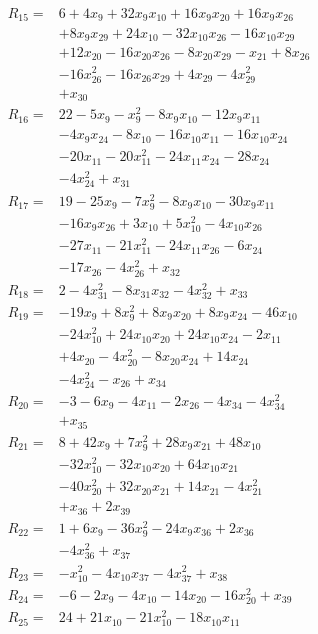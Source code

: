 \begin{align*}
R_{15}={}&6 +4x_{9} +32x_{9}x_{10} +16x_{9}x_{20} +16x_{9}x_{26}\\
&+8x_{9}x_{29} +24x_{10} -32x_{10}x_{26} -16x_{10}x_{29}\\
&+12x_{20} -16x_{20}x_{26} -8x_{20}x_{29} -x_{21} +8x_{26}\\
&-16x_{26}^{2} -16x_{26}x_{29} +4x_{29} -4x_{29}^{2}\\
&+x_{30}\\[3pt]
R_{16}={}&22 -5x_{9} -x_{9}^{2} -8x_{9}x_{10} -12x_{9}x_{11}\\
&-4x_{9}x_{24} -8x_{10} -16x_{10}x_{11} -16x_{10}x_{24}\\
&-20x_{11} -20x_{11}^{2} -24x_{11}x_{24} -28x_{24}\\
&-4x_{24}^{2} +x_{31}\\[3pt]
R_{17}={}&19 -25x_{9} -7x_{9}^{2} -8x_{9}x_{10} -30x_{9}x_{11}\\
&-16x_{9}x_{26} +3x_{10} +5x_{10}^{2} -4x_{10}x_{26}\\
&-27x_{11} -21x_{11}^{2} -24x_{11}x_{26} -6x_{24}\\
&-17x_{26} -4x_{26}^{2} +x_{32}\\[3pt]
R_{18}={}&2 -4x_{31}^{2} -8x_{31}x_{32} -4x_{32}^{2} +x_{33}\\[3pt]
R_{19}={}&-19x_{9} +8x_{9}^{2} +8x_{9}x_{20} +8x_{9}x_{24} -46x_{10}\\
&-24x_{10}^{2} +24x_{10}x_{20} +24x_{10}x_{24} -2x_{11}\\
&+4x_{20} -4x_{20}^{2} -8x_{20}x_{24} +14x_{24}\\
&-4x_{24}^{2} -x_{26} +x_{34}\\[3pt]
R_{20}={}&-3 -6x_{9} -4x_{11} -2x_{26} -4x_{34} -4x_{34}^{2}\\
&+x_{35}\\[3pt]
R_{21}={}&8 +42x_{9} +7x_{9}^{2} +28x_{9}x_{21} +48x_{10}\\
&-32x_{10}^{2} -32x_{10}x_{20} +64x_{10}x_{21}\\
&-40x_{20}^{2} +32x_{20}x_{21} +14x_{21} -4x_{21}^{2}\\
&+x_{36} +2x_{39}\\[3pt]
R_{22}={}&1 +6x_{9} -36x_{9}^{2} -24x_{9}x_{36} +2x_{36}\\
&-4x_{36}^{2} +x_{37}\\[3pt]
R_{23}={}&-x_{10}^{2} -4x_{10}x_{37} -4x_{37}^{2} +x_{38}\\[3pt]
R_{24}={}&-6 -2x_{9} -4x_{10} -14x_{20} -16x_{20}^{2} +x_{39}\\[3pt]
R_{25}={}&24 +21x_{10} -21x_{10}^{2} -18x_{10}x_{11}\\

\end{align*}
